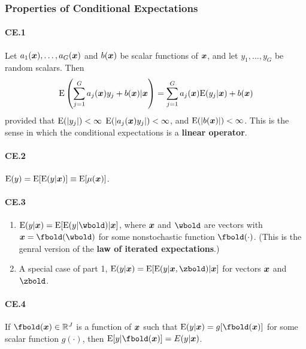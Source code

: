 \documentclass[11pt, oneside, a4paper, article]{article}
\numberwithin{equation}{section}
\begin{document}
\clearpage
\subsubsection{Properties of Conditional Expectations}

\paragraph{CE.1}

Let $a_{1}(\boldsymbol{x}), \dots, a_{G}(\boldsymbol{x})$ and $b(\boldsymbol{x})$ be scalar functions of $\boldsymbol{x}$, and let $y_{1}, \dots, y_{G}$ be random scalars.
Then
\begin{equation*}
\text{E}\left( \sum_{j=1}^{G} a_{j}(\boldsymbol{x}) y_{j} + b(\boldsymbol{x})	| \boldsymbol{x} \right)
=
\sum_{j=1}^{G} a_{j}(\boldsymbol{x}) \text{E}(y_{j} | \boldsymbol{x} ) + b(\boldsymbol{x})
\end{equation*}
provided that 
$\text{E}(| y_{j}|) < \infty$
$\text{E}(| a_{j}(\boldsymbol{x}) y_{j}|) < \infty$, and
$\text{E}(| b(\boldsymbol{x})|) < \infty$.
This is the sense in which the conditional expectations is a \textbf{linear operator}.

\paragraph{CE.2}
$\text{E}(y) = \text{E}[ \text{E}(y | \boldsymbol{x} ) ] \equiv \text{E}[\mu(\boldsymbol{x})]$.

\paragraph{CE.3}
\begin{enumerate}[noitemsep]
\item $\E(y | \xvec) = \E[ \E( y | \wbold ) | \xvec ]$,
where $\boldsymbol{x}$ and $\wbold$ are vectors with $\xvec = \fbold(\wbold)$ for some nonstochastic function $\fbold(\cdot)$.
(This is the genral version of the \textbf{law of iterated expectations}.)

\item A special case of part 1, $\E( y | \xvec) = \E[ \E( y | \xvec, \zbold) | \xvec]$ for vectors $\boldsymbol{x}$ and $\zbold$.

\end{enumerate}

\paragraph{CE.4}
If $\fbold(\xvec) \in \R^{J}$ is a function of $\boldsymbol{x}$ such that 
$\E(y | \xvec) = g[\fbold(\xvec)]$
for some scalar function $g(\cdot)$, then 
$\E[y | \fbold(\xvec)] = E(y | \xvec)$.
\end{document}

